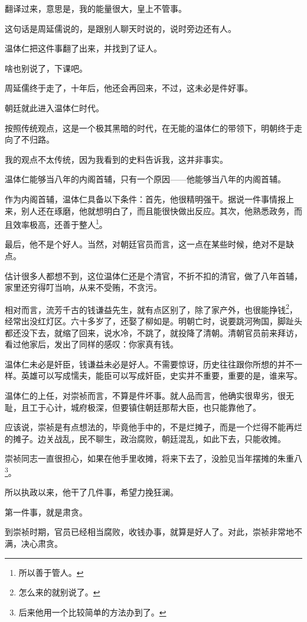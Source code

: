 \begin{multicols}{\theparacolNo}
翻译过来，意思是，我的能量很大，皇上不管事。

这句话是周延儒说的，是跟别人聊天时说的，说时旁边还有人。

温体仁把这件事翻了出来，并找到了证人。

啥也别说了，下课吧。

周延儒终于走了，十年后，他还会再回来，不过，这未必是件好事。

朝廷就此进入温体仁时代。

按照传统观点，这是一个极其黑暗的时代，在无能的温体仁的带领下，明朝终于走向了不归路。

我的观点不太传统，因为我看到的史料告诉我，这并非事实。

温体仁能够当八年的内阁首辅，只有一个原因——他能够当八年的内阁首辅。

作为内阁首辅，温体仁具备以下条件：首先，他很精明强干。据说一件事情报上来，别人还在琢磨，他就想明白了，而且能很快做出反应。其次，他熟悉政务，而且效率极高，还善于整人\footnote{所以善于管人。}。

最后，他不是个好人。当然，对朝廷官员而言，这一点在某些时候，绝对不是缺点。

估计很多人都想不到，这位温体仁还是个清官，不折不扣的清官，做了八年首辅，家里还穷得叮当响，从来不受贿，不贪污。

相对而言，流芳千古的钱谦益先生，就有点区别了，除了家产外，也很能挣钱\footnote{怎么来的就别说了。}，经常出没红灯区。六十多岁了，还娶了柳如是。明朝亡时，说要跳河殉国，脚趾头都还没下去，就缩了回来，说水冷，不跳了，就投降了清朝。清朝官员前来拜访，看过他家后，发出了同样的感叹：你家真有钱。

温体仁未必是奸臣，钱谦益未必是好人。不需要惊讶，历史往往跟你所想的并不一样。英雄可以写成懦夫，能臣可以写成奸臣，史实并不重要，重要的是，谁来写。

温体仁的上任，对崇祯而言，不算是件坏事。就人品而言，他确实很卑劣，很无耻，且工于心计，城府极深，但要镇住朝廷那帮大臣，也只能靠他了。

应该说，崇祯是有点想法的，毕竟他手中的，不是烂摊子，而是一个烂得不能再烂的摊子。边关战乱，民不聊生，政治腐败，朝廷混乱，如此下去，只能收摊。

崇祯同志一直很担心，如果在他手里收摊，将来下去了，没脸见当年摆摊的朱重八\footnote{后来他用一个比较简单的方法办到了。}。

所以执政以来，他干了几件事，希望力挽狂澜。

第一件事，就是肃贪。

到崇祯时期，官员已经相当腐败，收钱办事，就算是好人了。对此，崇祯非常地不满，决心肃贪。


\end{multicols}
